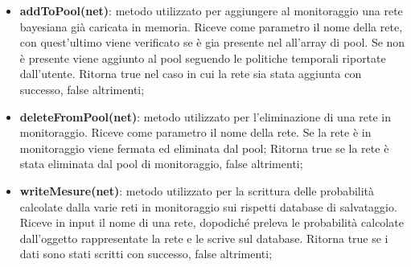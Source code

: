 \begin{itemize}
	\item \textbf{addToPool(net)}: metodo utilizzato per aggiungere al monitoraggio una rete bayesiana già 
	caricata in memoria. Riceve come parametro il nome della rete, con quest'ultimo viene verificato 
	se è gia presente nel all'array di pool. Se non è presente viene aggiunto al pool seguendo le politiche 
	temporali riportate dall'utente. Ritorna true nel caso in cui la rete sia stata aggiunta con successo, false 
	altrimenti; 

	\item \textbf{deleteFromPool(net)}: metodo utilizzato per l'eliminazione di una rete in monitoraggio. Riceve
	come parametro il nome della rete. Se la rete è in monitoraggio viene fermata ed eliminata dal pool; 
	Ritorna true se la rete è stata eliminata dal pool di monitoraggio, false altrimenti; 
	
	\item \textbf{writeMesure(net)}: metodo utilizzato per la scrittura delle probabilità calcolate dalla
	varie reti in monitoraggio sui rispetti database di salvataggio. Riceve in input il nome di una rete, 
	dopodiché preleva le probabilità calcolate dall'oggetto rappresentate la rete e le scrive sul database. 
	Ritorna true se i dati sono stati scritti con successo, false altrimenti; 
	
\end{itemize}

